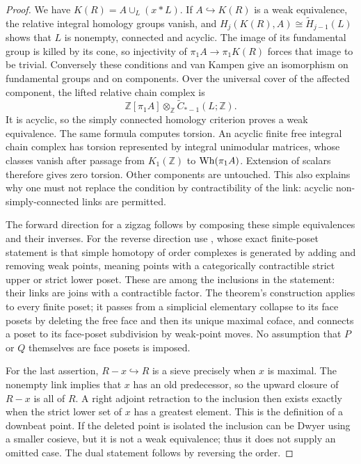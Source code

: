 \begin{proof}
We have $K(R)=A\cup_L(x*L)$. If $A\hookrightarrow K(R)$ is a weak
equivalence, the relative integral homology groups vanish, and
$H_j(K(R),A)\cong\widetilde H_{j-1}(L)$ shows that $L$ is nonempty,
connected and acyclic. The image of its fundamental group is killed
by its cone, so injectivity of $\pi_1A\to\pi_1K(R)$ forces that
image to be trivial. Conversely these conditions and van Kampen give
an isomorphism on fundamental groups and on components. Over the
universal cover of the affected component, the lifted relative chain
complex is
\[
 \mathbb Z[\pi_1A]\otimes_{\mathbb Z}
 \widetilde C_{*-1}(L;\mathbb Z).
\]
It is acyclic, so the simply connected homology criterion proves a
weak equivalence. The same formula computes torsion. An acyclic finite
free integral chain complex has torsion represented by integral
unimodular matrices, whose classes vanish after passage from
$K_1(\mathbb Z)$ to $\operatorname{Wh}(\pi_1A)$. Extension of scalars therefore gives
zero torsion. Other components are untouched. This also explains why
one must not replace the condition by contractibility of the link:
acyclic non-simply-connected links are permitted.

The forward direction for a zigzag follows by composing these simple
equivalences and their inverses. For the reverse direction use
\cite[Theorem~3.10(a)]{I_BarmakMinian2008}, whose exact finite-poset
statement is that simple homotopy of order complexes is generated by
adding and removing weak points, meaning points with a categorically
contractible strict upper or strict lower poset. These are among the
inclusions in the statement: their links are joins with a contractible
factor. The theorem's construction applies to every finite poset;
it passes from a simplicial elementary collapse to its face posets
by deleting the free face and then its unique maximal coface, and
connects a poset to its face-poset subdivision by weak-point moves.
No assumption that $P$ or $Q$ themselves are face posets is imposed.

For the last assertion, $R-x\hookrightarrow R$ is a sieve precisely
when $x$ is maximal. The nonempty link implies that $x$ has an old
predecessor, so the upward closure of $R-x$ is all of $R$. A right
adjoint retraction to the inclusion then exists exactly when the
strict lower set of $x$ has a greatest element. This is the definition
of a downbeat point. If the deleted point is isolated the inclusion
can be Dwyer using a smaller cosieve, but it is not a weak equivalence;
thus it does not supply an omitted case. The dual statement follows
by reversing the order.
\end{proof}

